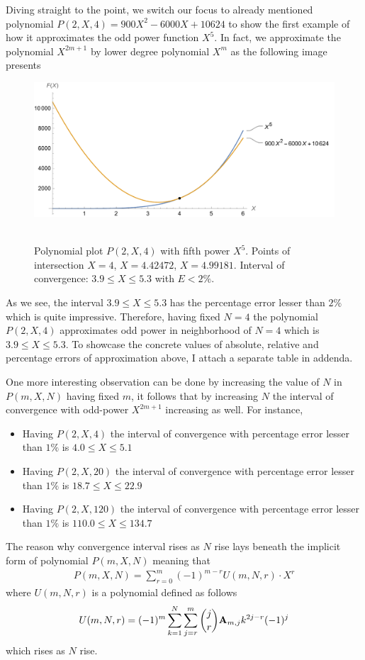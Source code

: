 Diving straight to the point, we switch our focus to already mentioned polynomial $P(2,X,4) = 900X^2 - 6000X + 10624$
to show the first example of how it approximates the odd power function $X^5$.
In fact, we approximate the polynomial $X^{2m+1}$ by lower degree polynomial $X^m$ as the following image presents
\begin{figure}[H]
    \centering
    \includegraphics[width=1\textwidth]{sections/images/03_plots_polynomial_p2_n4_with_fifth}
    ~\caption{Polynomial plot $P(2, X, 4)$ with fifth power $X^5$.
    Points of intersection $X=4$, $X=4.42472$, $X=4.99181$.
    Interval of convergence: $3.9 \leq X \leq 5.3$ with $E < 2\%$.
    }\label{fig:03_plots_polynomial_p2_n4_with_fifth}
\end{figure}
As we see, the interval $3.9 \leq X \leq 5.3$ has the percentage error lesser than $2\%$ which is quite impressive.
Therefore, having fixed $N=4$ the polynomial $P(2, X, 4)$ approximates odd power in neighborhood of $N=4$
which is $3.9 \leq X \leq 5.3$.
To showcase the concrete values of absolute, relative and percentage errors of approximation above, I attach a separate
table in addenda.

One more interesting observation can be done by increasing the value of $N$ in $P(m, X, N)$ having fixed $m$, it
follows that by increasing $N$ the interval of convergence with odd-power $X^{2m+1}$ increasing as well.
For instance,
\begin{itemize}
    \item Having $P(2, X, 4)$ the interval of convergence with percentage error lesser than $1\%$ is $4.0 \leq X \leq 5.1$
    \item Having $P(2, X, 20)$ the interval of convergence with percentage error lesser than $1\%$ is $18.7 \leq X \leq 22.9$
    \item Having $P(2, X, 120)$ the interval of convergence with percentage error lesser than $1\%$ is $110.0 \leq X \leq 134.7$
\end{itemize}
The reason why convergence interval rises as $N$ rise lays beneath the implicit form of polynomial $P(m,X,N)$
meaning that
\begin{align*}
    P(m,X,N) = \sum_{r=0}^{m} (-1)^{m-r} U(m, N, r) \cdot X^{r}
\end{align*}
where $U(m, N, r)$ is a polynomial defined as follows
\begin{align*}
    U(m, N, r) = (-1)^m \sum_{k=1}^{N} \sum_{j=r}^{m} \binom{j}{r} {\mathbf{A}} \sb{m,j} k^{2j-r} (-1)^j
\end{align*}
which rises as $N$ rise.
